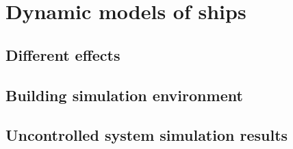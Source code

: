 \section{Dynamic models of ships}

\subsection{Different effects}

\subsection{Building simulation environment}

\subsection{Uncontrolled system simulation results}